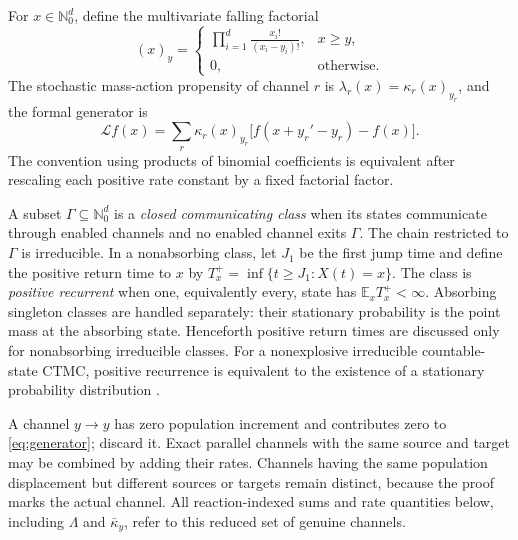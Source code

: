 For \(x\in\mathbb N_0^d\), define the multivariate falling factorial
\begin{equation}\label{eq:falling}
  (x)_y=
  \begin{cases}
  \displaystyle\prod_{i=1}^d\frac{x_i!}{(x_i-y_i)!},&x\ge y,\\[1ex]
  0,&\text{otherwise}.
  \end{cases}
\end{equation}
The stochastic mass-action propensity of channel \(r\) is
\(\lambda_r(x)=\kappa_r(x)_{y_r}\), and the formal generator is
\begin{equation}\label{eq:generator}
  \mathcal Lf(x)=\sum_r\kappa_r(x)_{y_r}
  \bigl[f(x+y_r'-y_r)-f(x)\bigr].
\end{equation}
The convention using products of binomial coefficients is equivalent after
rescaling each positive rate constant by a fixed factorial factor.

A subset \(\Gamma\subseteq\mathbb N_0^d\) is a \emph{closed communicating
class} when its states communicate through enabled channels and no enabled
channel exits \(\Gamma\).  The chain restricted to \(\Gamma\) is
irreducible.  In a nonabsorbing class, let \(J_1\) be the first jump time and
define the positive return time to \(x\) by
\(T_x^+=\inf\{t\ge J_1:X(t)=x\}\).  The class is \emph{positive recurrent}
when one, equivalently every, state has \(\mathbb E_xT_x^+<\infty\).
Absorbing singleton classes are handled separately: their stationary
probability is the point mass at the absorbing state.  Henceforth positive
return times are discussed only for nonabsorbing irreducible classes.  For a
nonexplosive irreducible countable-state CTMC, positive recurrence is
equivalent to the existence of a stationary probability distribution
\citep{Norris1997}.

A channel \(y\to y\) has zero population increment and contributes zero to
\eqref{eq:generator}; discard it.  Exact parallel channels with the same
source and target may be combined by adding their rates.  Channels having the
same population displacement but different sources or targets remain
distinct, because the proof marks the actual channel.
All reaction-indexed sums and rate quantities below, including \(\Lambda\)
and \(\bar\kappa_y\), refer to this reduced set of genuine channels.

